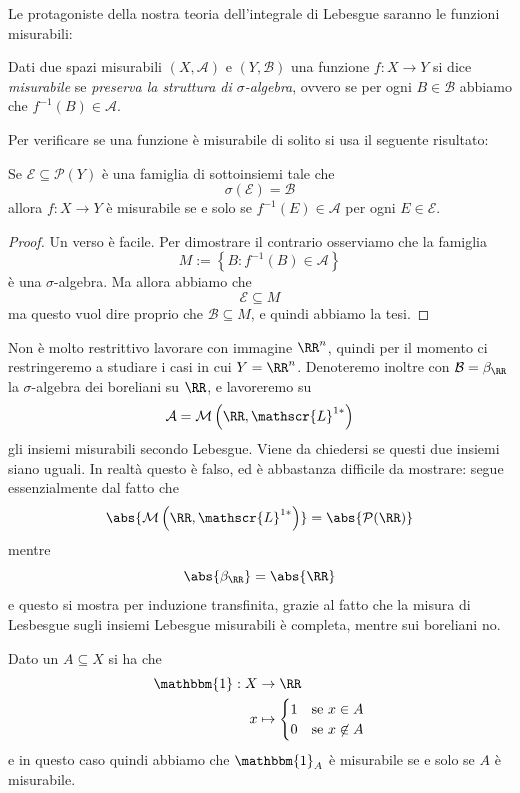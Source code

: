 \documentclass[11pt]{scrartcl}
\newcommand{\parti}[1]{\mathcal{P}\!\left(#1\right)}
\begin{document}
	Le protagoniste della nostra teoria dell'integrale di Lebesgue saranno le funzioni misurabili:
	\begin{definition}
		Dati due spazi misurabili $(X,\mathcal{A})$ e $(Y,\mathcal{B})$ una funzione $f:X\to Y$ si dice \textit{misurabile} se \textit{preserva la struttura di $\sigma$-algebra}, ovvero se per ogni $B\in \mathcal{B}$ abbiamo che $f^{-1}(B)\in \mathcal{A}$.
	\end{definition}
	Per verificare se una funzione è misurabile di solito si usa il seguente risultato:
	\begin{lemma}
		Se $\mathcal{E}\subseteq \parti{Y}$ è una famiglia di sottoinsiemi tale che
		$$\sigma\left(\mathcal{E}\right)=\mathcal{B}$$
		allora $f:X\to Y$  è misurabile se e solo se $f^{-1}(E)\in \mathcal{A}$ per ogni $E\in \mathcal{E}$.
	\end{lemma}
	\begin{proof}
		Un verso è facile. Per dimostrare il contrario osserviamo che la famiglia
		$$M:=\left\{B:f^{-1}(B)\in \mathcal{A}\right\}$$
		è una $\sigma$-algebra. Ma allora abbiamo che
		$$\mathcal{E}\subseteq M$$
		ma questo vuol dire proprio che $\mathcal{B}\subseteq M$, e quindi abbiamo la tesi.
	\end{proof}
	Non è molto restrittivo lavorare con immagine $\RR^n$, quindi per il momento ci restringeremo a studiare i casi in cui $Y=\RR^n$. Denoteremo inoltre con $\mathcal{B}=\beta_{\RR}$ la $\sigma$-algebra dei boreliani su $\RR$, e lavoreremo su 
	$$\mathcal{A}=\mathcal{M}\left(\RR,\mathscr{L}^{1*}\right)$$
	gli insiemi misurabili secondo Lebesgue. Viene da chiedersi se questi due insiemi siano uguali. In realtà questo è falso, ed è abbastanza difficile da mostrare: segue essenzialmente dal fatto che
	$$\abs{\mathcal{M}\left(\RR,\mathscr{L}^{1*}\right)}=\abs{\parti{\RR}}$$
	mentre
	$$\abs{\beta_{\RR}}=\abs{\RR}$$
	e questo si mostra per induzione transfinita, grazie al fatto che la misura di Lesbesgue sugli insiemi Lebesgue misurabili è completa, mentre sui boreliani no.
	\begin{example}
		Dato un $A\subseteq X$ si ha che
		\begin{align*}
			\mathbbm{1}:X & \to \RR \\
			x & \mapsto \begin{cases}
				1 & \text{se $x\in A$} \\
				0 & \text{se $x\not\in A$}
			\end{cases}
		\end{align*}
		e in questo caso quindi abbiamo che $\mathbbm{1}_A$ è misurabile se e solo se $A$ è misurabile.
	\end{example}
\end{document}
